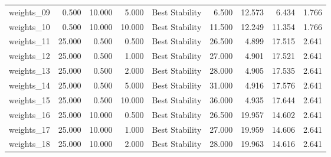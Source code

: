 \begin{table}
{\begin{tabular}{lrrrlrrrr}
 weights\_09 &              0.500 &         10.000 &             5.000 &   Best Stability &                        6.500 &                             12.573 &                            6.434 &                        1.766 \\
 weights\_10 &              0.500 &         10.000 &            10.000 &   Best Stability &                       11.500 &                             12.249 &                           11.354 &                        1.766 \\
 weights\_11 &             25.000 &          0.500 &             0.500 &   Best Stability &                       26.500 &                              4.899 &                           17.515 &                        2.641 \\
 weights\_12 &             25.000 &          0.500 &             1.000 &   Best Stability &                       27.000 &                              4.901 &                           17.521 &                        2.641 \\
 weights\_13 &             25.000 &          0.500 &             2.000 &   Best Stability &                       28.000 &                              4.905 &                           17.535 &                        2.641 \\
 weights\_14 &             25.000 &          0.500 &             5.000 &   Best Stability &                       31.000 &                              4.916 &                           17.576 &                        2.641 \\
 weights\_15 &             25.000 &          0.500 &            10.000 &   Best Stability &                       36.000 &                              4.935 &                           17.644 &                        2.641 \\
 weights\_16 &             25.000 &         10.000 &             0.500 &   Best Stability &                       26.500 &                             19.957 &                           14.602 &                        2.641 \\
 weights\_17 &             25.000 &         10.000 &             1.000 &   Best Stability &                       27.000 &                             19.959 &                           14.606 &                        2.641 \\
 weights\_18 &             25.000 &         10.000 &             2.000 &   Best Stability &                       28.000 &                             19.963 &                           14.616 &                        2.641 \\

\end{tabular}}
\end{table}

